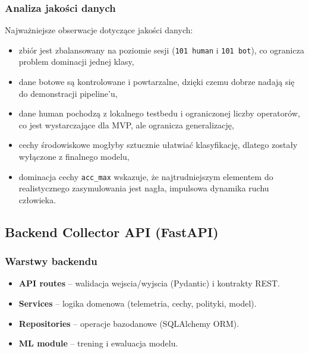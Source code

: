 \subsubsection{Analiza jakości danych}
Najważniejsze obserwacje dotyczące jakości danych:
\begin{itemize}
  \item zbiór jest zbalansowany na poziomie sesji (\texttt{101 human} i
  \texttt{101 bot}), co ogranicza problem dominacji jednej klasy,
  \item dane botowe są kontrolowane i powtarzalne, dzięki czemu dobrze nadają się
  do demonstracji pipeline'u,
  \item dane human pochodzą z lokalnego testbedu i ograniczonej liczby operatorów,
  co jest wystarczające dla MVP, ale ogranicza generalizację,
  \item cechy środowiskowe mogłyby sztucznie ułatwiać klasyfikację, dlatego
  zostały wyłączone z finalnego modelu,
  \item dominacja cechy \texttt{acc\_max} wskazuje, że najtrudniejszym elementem
  do realistycznego zasymulowania jest nagła, impulsowa dynamika ruchu człowieka.
\end{itemize}

\subsection{Backend Collector API (FastAPI)}
\subsubsection{Warstwy backendu}
\begin{itemize}
  \item \textbf{API routes} -- walidacja wejscia/wyjscia (Pydantic) i kontrakty REST.
  \item \textbf{Services} -- logika domenowa (telemetria, cechy, polityki, model).
  \item \textbf{Repositories} -- operacje bazodanowe (SQLAlchemy ORM).
  \item \textbf{ML module} -- trening i ewaluacja modelu.
\end{itemize}

